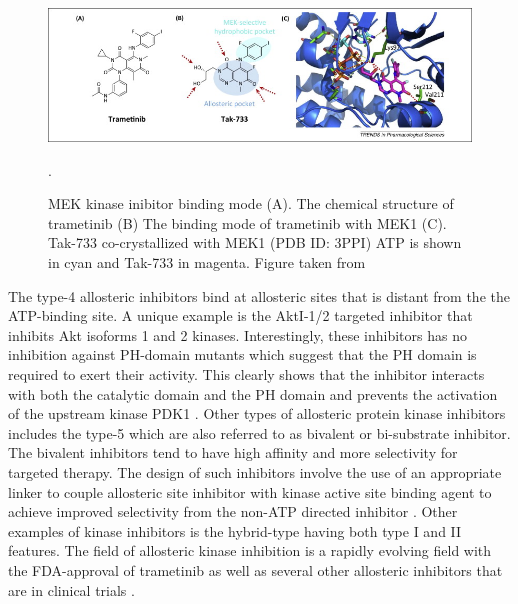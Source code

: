 \documentclass[a4paper, 11pt]{article}
\begin{document}
\begin{figure}[H]
	\includegraphics[width=\linewidth]{figures/trametinib.jpg}
	\centering
	\caption{MEK kinase inibitor binding mode (A). The chemical structure of trametinib (B) The binding mode of trametinib with MEK1 (C). Tak-733 co-crystallized with MEK1 (PDB ID: 3PPI) ATP is shown in cyan and Tak-733 in magenta. Figure taken from \cite{wu2015fda}}.
	\label{trametinib}
\end{figure}
The type-4 allosteric inhibitors bind at allosteric sites that is distant from the   the ATP-binding site. A unique example is the AktI-1/2 targeted inhibitor that inhibits Akt isoforms 1 and 2 kinases. Interestingly, these inhibitors has no inhibition against PH-domain mutants which suggest that the PH domain is required to exert their activity. This clearly shows that the inhibitor interacts with both the catalytic domain and the PH domain and prevents the activation of the upstream kinase PDK1 \cite{barnett2005identification}. Other types of allosteric protein kinase inhibitors includes the type-5 which are also referred to as bivalent or bi-substrate inhibitor. The bivalent inhibitors tend to have high affinity and more selectivity for targeted therapy. The design of such inhibitors involve the use of an appropriate linker to couple allosteric site inhibitor with kinase active site binding agent to achieve improved selectivity from the non-ATP directed inhibitor \cite {lamba2012new}. Other examples of kinase inhibitors is the hybrid-type having both type I and II features. The field of allosteric kinase inhibition is a rapidly evolving field with the FDA-approval of trametinib as well as several other allosteric inhibitors that are in clinical trials \cite{wu2015allosteric}.
\end{document}
